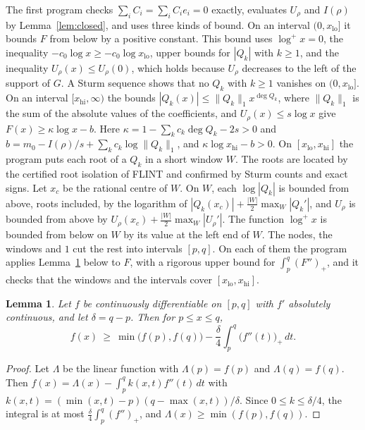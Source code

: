 \documentclass[11pt]{amsart}
\newtheorem{lemma}[theorem]{Lemma}
\theoremstyle{remark}
\numberwithin{equation}{section}
\newcommand{\logp}{\log^{+}}
\begin{document}
The first program checks $\sum_iC_i=\sum_iC_ie_i=0$ exactly, evaluates $U_\rho$ and $I(\rho)$ by Lemma~\ref{lem:closed}, and uses three kinds of bound. On an interval $(0,x_{\mathrm{lo}}]$ it bounds $F$ from below by a positive constant. This bound uses $\logp x=0$, the inequality $-c_0\log x\ge-c_0\log x_{\mathrm{lo}}$, upper bounds for $|Q_k|$ with $k\ge1$, and the inequality $U_\rho(x)\le U_\rho(0)$, which holds because $U_\rho$ decreases to the left of the support of $G$. A Sturm sequence shows that no $Q_k$ with $k\ge1$ vanishes on $(0,x_{\mathrm{lo}}]$. On an interval $[x_{\mathrm{hi}},\infty)$ the bounds $|Q_k(x)|\le\|Q_k\|_1x^{\deg Q_k}$, where $\|Q_k\|_1$ is the sum of the absolute values of the coefficients, and $U_\rho(x)\le s\log x$ give $F(x)\ge\kappa\log x-b$. Here $\kappa=1-\sum_kc_k\deg Q_k-2s>0$ and $b=m_0-I(\rho)/s+\sum_kc_k\log\|Q_k\|_1$, and $\kappa\log x_{\mathrm{hi}}-b>0$. On $[x_{\mathrm{lo}},x_{\mathrm{hi}}]$ the program puts each root of a $Q_k$ in a short window $W$. The roots are located by the certified root isolation of FLINT and confirmed by Sturm counts and exact signs. Let $x_c$ be the rational centre of $W$. On $W$, each $\log|Q_k|$ is bounded from above, roots included, by the logarithm of $|Q_k(x_c)|+\frac{|W|}2\max_W|Q_k'|$, and $U_\rho$ is bounded from above by $U_\rho(x_c)+\frac{|W|}2\max_W|U_\rho'|$. The function $\logp x$ is bounded from below on $W$ by its value at the left end of $W$. The nodes, the windows and $1$ cut the rest into intervals $[p,q]$. On each of them the program applies Lemma~\ref{lem:chord} below to $F$, with a rigorous upper bound for $\int_p^q(F'')_+$, and it checks that the windows and the intervals cover $[x_{\mathrm{lo}},x_{\mathrm{hi}}]$.

\begin{lemma}\label{lem:chord}
Let $f$ be continuously differentiable on $[p,q]$ with $f'$ absolutely continuous, and let $\delta=q-p$. Then for $p\le x\le q$,
\[
f(x)\ \ge\ \min\bigl(f(p),f(q)\bigr)-\frac\delta4\int_p^q\bigl(f''(t)\bigr)_+\,dt.
\]
\end{lemma}

\begin{proof}
Let $\Lambda$ be the linear function with $\Lambda(p)=f(p)$ and $\Lambda(q)=f(q)$. Then $f(x)=\Lambda(x)-\int_p^qk(x,t)f''(t)\,dt$ with $k(x,t)=(\min(x,t)-p)(q-\max(x,t))/\delta$. Since $0\le k\le\delta/4$, the integral is at most $\frac\delta4\int_p^q(f'')_+$, and $\Lambda(x)\ge\min(f(p),f(q))$.
\end{proof}
\end{document}
